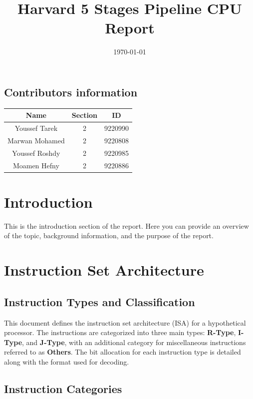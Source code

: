 \documentclass{report}
\begin{document}
\title{Harvard 5 Stages Pipeline CPU Report}
\date{\today}
\maketitle

\section{Contributors information}
\begin{center}
\begin{tabular}{|c|c|c|}
\hline
\textbf{Name} & \textbf{Section} & \textbf{ID} \\
\hline
Youssef Tarek & 2 & 9220990 \\
Marwan Mohamed & 2 & 9220808 \\
Youssef Roshdy & 2 & 9220985 \\
Moamen Hefny & 2 & 9220886 \\
\hline
\end{tabular}
\end{center}

\tableofcontents
\chapter{Introduction}
This is the introduction section of the report. Here you can provide an overview of the topic, background information, and the purpose of the report.

\chapter{Instruction Set Architecture}

\section*{Instruction Types and Classification}
This document defines the instruction set architecture (ISA) for a hypothetical processor. The instructions are categorized into three main types: \textbf{R-Type}, \textbf{I-Type}, and \textbf{J-Type}, with an additional category for miscellaneous instructions referred to as \textbf{Others}. The bit allocation for each instruction type is detailed along with the format used for decoding.

\section*{Instruction Categories}
\end{document}

